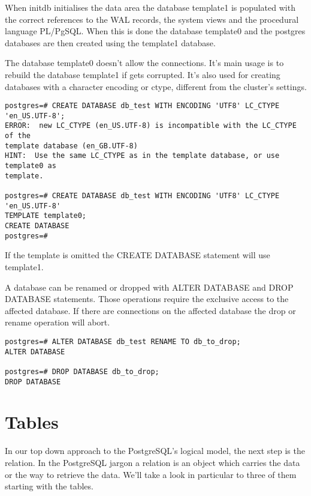 When initdb initialises the data area the database template1 is populated with the correct
references to the WAL records, the system views and the procedural language PL/PgSQL. When
this is done the database template0 and the postgres databases are then created using the template1
database.

The database template0 doesn't allow the connections. It's main usage is to rebuild the
database template1 if gets corrupted. It's also used for creating databases with a character
encoding or ctype, different from the cluster's settings. 

\begin{lstlisting}[style=pgsql]
postgres=# CREATE DATABASE db_test WITH ENCODING 'UTF8' LC_CTYPE 'en_US.UTF-8';
ERROR:  new LC_CTYPE (en_US.UTF-8) is incompatible with the LC_CTYPE of the 
template database (en_GB.UTF-8)
HINT:  Use the same LC_CTYPE as in the template database, or use template0 as 
template.

postgres=# CREATE DATABASE db_test WITH ENCODING 'UTF8' LC_CTYPE 'en_US.UTF-8' 
TEMPLATE template0;
CREATE DATABASE
postgres=# 

\end{lstlisting}

If the template is omitted the CREATE DATABASE statement will use template1. 

A database can be renamed or dropped with ALTER DATABASE and DROP DATABASE 
statements. Those operations require the exclusive access to the affected database. If there are
connections on the affected database the drop or rename operation will abort.

\begin{lstlisting}[style=pgsql]
postgres=# ALTER DATABASE db_test RENAME TO db_to_drop;
ALTER DATABASE

postgres=# DROP DATABASE db_to_drop;
DROP DATABASE

\end{lstlisting}




\section{Tables}
\label{sec:TABLES}
In our top down approach to the PostgreSQL's logical model, the next step is the relation.
In the PostgreSQL jargon a relation is an object which carries the data or the way to
retrieve the data. We'll take a look in particular to three of them starting with the
tables.\newline


